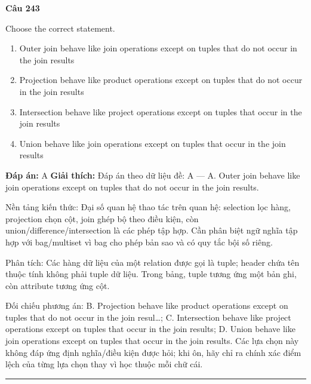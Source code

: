 \documentclass[11pt,a4paper]{article}
\newenvironment{question}[1]{%
  \par\vspace{1em}\noindent\textbf{\large Câu #1}\par\vspace{0.4em}
}{%
  \par\vspace{1em}\hrule\vspace{0.6em}
}
\newenvironment{choices}{%
  \begin{enumerate}[label=\textbf{\Alph*.},leftmargin=2.2em,itemsep=2pt,topsep=3pt]
}{%
  \end{enumerate}
}
\newcommand{\choice}{\item}
\begin{document}
\begin{question}{243}
Choose the correct statement.
\begin{choices}
\choice Outer join behave like join operations except on tuples that do not occur in the join results
\choice Projection behave like product operations except on tuples that do not occur in the join results
\choice Intersection behave like project operations except on tuples that occur in the join results
\choice Union behave like join operations except on tuples that occur in the join results
\end{choices}
\textbf{Đáp án:} A
\textbf{Giải thích:} Đáp án theo dữ liệu đề: A — A. Outer join behave like join operations except on tuples that do not occur in the join results.

Nền tảng kiến thức: Đại số quan hệ thao tác trên quan hệ: selection lọc hàng, projection chọn cột, join ghép bộ theo điều kiện, còn union/difference/intersection là các phép tập hợp. Cần phân biệt ngữ nghĩa tập hợp với bag/multiset vì bag cho phép bản sao và có quy tắc bội số riêng.

Phân tích: Các hàng dữ liệu của một relation được gọi là tuple; header chứa tên thuộc tính không phải tuple dữ liệu. Trong bảng, tuple tương ứng một bản ghi, còn attribute tương ứng cột.

Đối chiếu phương án: B. Projection behave like product operations except on tuples that do not occur in the join resul…; C. Intersection behave like project operations except on tuples that occur in the join results; D. Union behave like join operations except on tuples that occur in the join results. Các lựa chọn này không đáp ứng định nghĩa/điều kiện được hỏi; khi ôn, hãy chỉ ra chính xác điểm lệch của từng lựa chọn thay vì học thuộc mỗi chữ cái.
\end{question}
\end{document}
